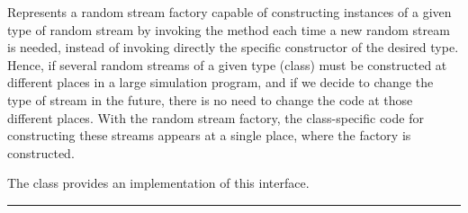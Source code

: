 
Represents a random stream factory capable
of constructing instances of a given type of random stream
by invoking the  method
each time a new random stream is needed, instead of invoking
directly the specific constructor of the desired type.
Hence, if several random streams of a given type (class) must be
constructed at different places in a large simulation program,
and if we decide to change the type of stream in the future,
there is no need to change the code at those different places.
With the random stream factory, the class-specific
code for constructing these streams appears at a single place,
where the factory is constructed.

The class  provides an 
implementation of this interface.


\bigskip\hrule


